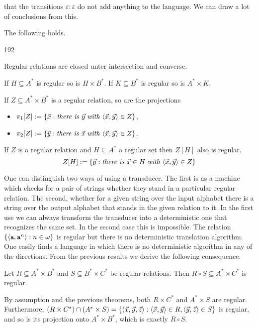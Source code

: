 that the transitions $\varepsilon : \varepsilon$ do not
add anything to the language. We can draw a lot of conclusions
from this.
\begin{cor}
\label{cor:transducer}
The following holds.
\begin{dingautolist}{192}
\item
Regular relations are closed unter intersection and converse.
\item
If $H \subseteq A^{\ast}$ is regular so is $H \times B^{\ast}$.
If $K \subseteq B^{\ast}$ is regular so is $A^{\ast} \times K$.
\item
If $Z  \subseteq A^{\ast}\times B^{\ast}$ is a regular relation,
so are the projections
\begin{itemize}
\item $\pi_1[Z] := \{\vec{x} :
    \mbox{\it there is }\vec{y}\; \mbox{\it with }
        \langle \vec{x}, \vec{y}\rangle \in Z\}$,
\item $\pi_2[Z] := \{\vec{y} :
    \mbox{\it there is }\vec{x}\; \mbox{\it with }
        \langle \vec{x}, \vec{y}\rangle \in Z\}$.
\end{itemize}
\item
If $Z$ is a regular relation and $H \subseteq A^{\ast}$ a
regular set then $Z[H]$ also is regular.
$$Z[H] := \{\vec{y} : \mbox{\it there is }
\vec{x} \in H \; \mbox{\it with }\langle \vec{x}, \vec{y} \rangle \in Z\}$$
\end{dingautolist}
\end{cor}
One can distinguish two ways of using a transducer. The first is
as a machine which checks for a pair of strings whether they
stand in a particular regular relation. The second, whether
for a given string over the input alphabet there is a string
over the output alphabet that stands in the given relation to it.
In the first use we can always transform the transducer into
a deterministic one that recognizes the same set. In the second
case this is impossible. The relation $\{\langle \mbox{\tt a},
\mbox{\tt a}^n\rangle : n \in \omega\}$ is regular but there is no
deterministic translation algorithm. One easily finds a
language in which there is no deterministic algorithm in any
of the directions. From the previous results we derive the
following consequence.
\begin{cor}
Let $R \subseteq A^{\ast} \times B^{\ast}$ and $S \subseteq
B^{\ast}\times C^{\ast}$ be regular relations. Then
$R \circ S \subseteq A^{\ast} \times C^{\ast}$ is regular.
\end{cor}
\proofbeg
By assumption and the previous theorems, both $R \times C^{\ast}$
and $A^{\ast} \times S$ are regular. Furthermore, $(R \times C^{\ast}) 
\cap (A^{\ast} \times S) =
\{\langle \vec{x}, \vec{y}, \vec{z}\rangle : \langle \vec{x}, \vec{y}\rangle
\in R, \langle \vec{y}, \vec{z}\rangle \in S\}$ is regular, and so is
its projection onto $A^{\ast}\times B^{\ast}$, which is exactly
$R \circ S$.
\proofend

